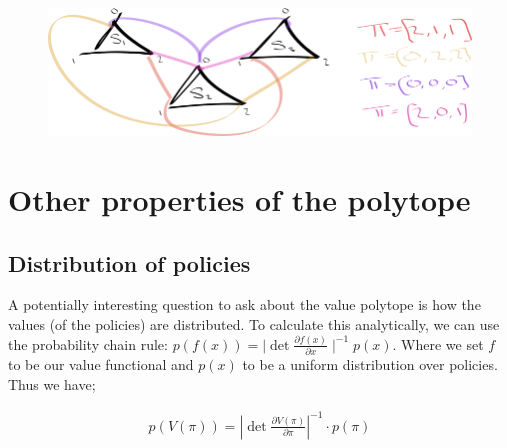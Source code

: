 \begin{figure}[h]
\centering
\includegraphics[width=1\textwidth,height=0.25\textheight]{../../pictures/drawings/3-state-3-action-simplices.png}
\caption{}
\end{figure}



\section{Other properties of the polytope} \label{polytope-extras}



\subsection{Distribution of policies}

A potentially interesting question to ask about the value polytope is how the
values (of the policies) are distributed. To calculate this
analytically, we can use the probability chain rule:
\(p(f(x)) = \mid \det\frac{\partial f(x)}{\partial x}\mid^{-1}p(x)\).
Where we set \(f\) to be our value functional and \(p(x)\) to be a
uniform distribution over policies. Thus we have;

\begin{align}
p(V(\pi)) = |\det \frac{\partial V(\pi)}{\partial \pi}|^{-1} \cdot p(\pi) \tag{density}
\end{align}

